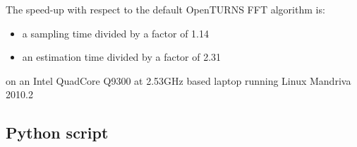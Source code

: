 The speed-up with respect to the default OpenTURNS FFT algorithm is:
\begin{itemize}
\item a sampling time divided by a factor of 1.14
\item an estimation time divided by a factor of 2.31
\end{itemize}

on an Intel QuadCore Q9300 at 2.53GHz based laptop running Linux Mandriva 2010.2

\subsection{Python script}


